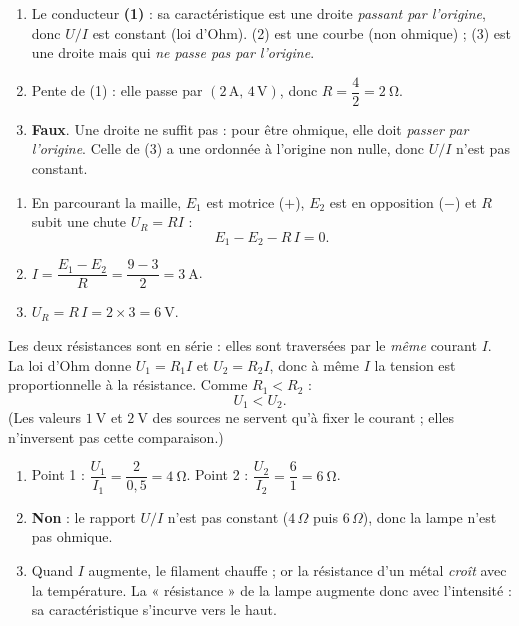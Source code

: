 \documentclass[11pt,a4paper]{article}
\begin{document}
\usetikzlibrary{babel}
\begin{corrige}
\begin{enumerate}[label=\alph*)]
  \item Le conducteur \textbf{(1)} : sa caractéristique est une droite \emph{passant par l'origine},
        donc $U/I$ est constant (loi d'Ohm). (2) est une courbe (non ohmique) ; (3) est une droite mais
        qui \emph{ne passe pas par l'origine}.
  \item Pente de (1) : elle passe par $(2\,\si{\ampere},\,4\,\si{\volt})$, donc
        $R=\dfrac{4}{2}=\qty{2}{\ohm}$.
  \item \textbf{Faux}. Une droite ne suffit pas : pour être ohmique, elle doit \emph{passer par
        l'origine}. Celle de (3) a une ordonnée à l'origine non nulle, donc $U/I$ n'est pas constant.
\end{enumerate}
\end{corrige}

\begin{corrige}
\begin{enumerate}[label=\alph*)]
  \item En parcourant la maille, $E_1$ est motrice ($+$), $E_2$ est en opposition ($-$) et $R$ subit une
        chute $U_R=RI$ : \[ E_1-E_2-R\,I=0. \]
  \item $I=\dfrac{E_1-E_2}{R}=\dfrac{9-3}{2}=\qty{3}{\ampere}$.
  \item $U_R=R\,I=2\times3=\qty{6}{\volt}$.
\end{enumerate}
\end{corrige}

\begin{corrige}
Les deux résistances sont en série : elles sont traversées par le \emph{même} courant $I$. La loi
d'Ohm donne $U_1=R_1 I$ et $U_2=R_2 I$, donc à même $I$ la tension est proportionnelle à la
résistance. Comme $R_1<R_2$ :
\[ \boxed{U_1<U_2.} \]
(Les valeurs $\qty{1}{\volt}$ et $\qty{2}{\volt}$ des sources ne servent qu'à fixer le courant ; elles
n'inversent pas cette comparaison.)
\end{corrige}

\begin{corrige}
\begin{enumerate}[label=\alph*)]
  \item Point 1 : $\dfrac{U_1}{I_1}=\dfrac{2}{0{,}5}=\qty{4}{\ohm}$. \quad
        Point 2 : $\dfrac{U_2}{I_2}=\dfrac{6}{1}=\qty{6}{\ohm}$.
  \item \textbf{Non} : le rapport $U/I$ n'est pas constant ($4\,\Omega$ puis $6\,\Omega$), donc la lampe
        n'est pas ohmique.
  \item Quand $I$ augmente, le filament chauffe ; or la résistance d'un métal \emph{croît} avec la
        température. La « résistance » de la lampe augmente donc avec l'intensité : sa caractéristique
        s'incurve vers le haut.
\end{enumerate}
\end{corrige}
\end{document}
